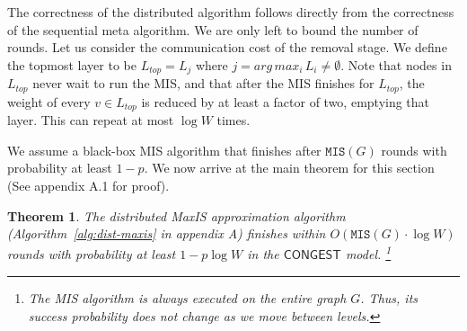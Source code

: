 \documentclass[11pt]{article}
\newtheorem{theorem}{Theorem}[section]
\newtheorem{lemma}[theorem]{Lemma}
\newcommand{\Ltop}{L_{top}}
\newcommand{\Wmax}{W}%
\newcommand{\MIS}{\texttt{MIS}(G)}
\begin{document}
The correctness of the distributed algorithm follows directly from the correctness of the sequential meta algorithm. We are only left to bound the number of rounds. Let us consider the communication cost of the removal stage. We define the topmost layer to be $\Ltop=L_j$ where $j=arg\,max_{i} \, L_i \neq \emptyset$.
Note that nodes in $\Ltop$ never wait to run the MIS, and that after the MIS finishes for $\Ltop$, the weight of every $v \in \Ltop$ is reduced by at least a factor of two, emptying that layer. This can repeat at most $\log \Wmax$ times. \par
We assume a black-box MIS algorithm that finishes after $\MIS$ rounds with probability at least $1-p$. 
We now arrive at the main theorem for this section (See appendix A.1 for proof).


\begin{theorem}
	\label{thm:maxis-main}
	The distributed MaxIS approximation algorithm (Algorithm~\ref{alg:dist-maxis} in appendix A) finishes within $O(\MIS\cdot \log \Wmax)$ rounds with probability at least $1-p\log \Wmax$ in the $\mathsf{CONGEST}$ model.
	\footnote{The MIS algorithm is always executed on the entire graph $G$. Thus, its success probability does not change as we move between levels.}
\end{theorem}
%	
\end{document}

